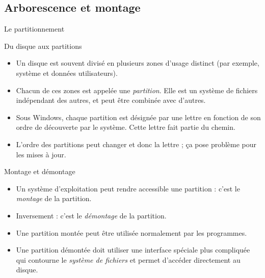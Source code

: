 \subsection{Arborescence et montage}
\begin{frame}{Le partitionnement}
  \begin{block}{Du disque aux partitions}
    \begin{itemize}
    \item Un disque est souvent divisé en plusieurs zones d'usage
      distinct (par exemple, système et données utilisateurs).
    \item Chacun de ces zones est appelée une \emph{partition}. Elle
      est un système de fichiers indépendant des autres, et peut être
      combinée avec d'autres.
    \item Sous Windows, chaque partition est désignée par une lettre
      en fonction de son ordre de découverte par le système. Cette
      lettre fait partie du chemin.
    \item[\dialogwarning] L'ordre des partitions peut changer et donc
      la lettre ; ça pose problème pour les mises à jour.
    \end{itemize}
  \end{block}
  \begin{block}{Montage et démontage}
    \begin{itemize}
    \item Un système d'exploitation peut rendre accessible une
      partition : c'est le \emph{montage} de la partition.
    \item Inversement : c'est le \emph{démontage} de la partition.
    \item[\dialogsystem] Une partition montée peut être utilisée
      normalement par les programmes.
    \item[\dialogerror] Une partition démontée doit utiliser une
      interface spéciale plus compliquée qui contourne le \emph{système
        de fichiers} et permet d'accéder directement au disque.
    \end{itemize}
  \end{block}
\end{frame}

